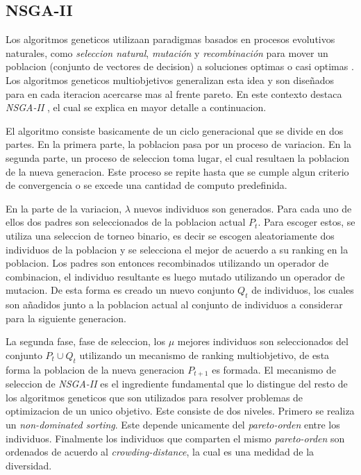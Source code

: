 \subsection{NSGA-II}

Los algoritmos geneticos utilizaan paradigmas basados en procesos evolutivos naturales, como \textit{seleccion natural}, \textit{mutaci\'on} y \textit{recombinaci\'on} para mover un poblacion (conjunto de vectores de decision) a soluciones optimas o casi optimas \cite{back1996evolutionary}. Los algoritmos geneticos multiobjetivos generalizan esta idea y son diseñados para en cada iteracion acercarse mas al frente pareto. En este contexto destaca \emph{NSGA-II} \cite{deb2002nsgaii}, el cual se explica en mayor detalle a continuacion.

El algoritmo consiste basicamente de un ciclo generacional que se divide en dos partes. En la primera parte, la poblacion pasa por un proceso de variacion. En la segunda parte, un proceso de seleccion toma lugar, el cual resultaen la poblacion de la nueva generacion. Este proceso se repite hasta que se cumple algun criterio de convergencia o se excede una cantidad de computo predefinida.

En la parte de la variacion, $\lambda$ nuevos individuos son generados. Para cada uno de ellos dos padres son seleccionados de la poblacion actual $P_t$. Para escoger estos, se utiliza una seleccion de torneo binario, es decir se escogen aleatoriamente dos individuos de la poblacion y se selecciona el mejor de acuerdo a su ranking en la poblacion. Los padres son entonces recombinados utilizando un operador de combinacion, el individuo resultante es luego mutado utilizando un operador de mutacion. De esta forma es creado un nuevo conjunto $Q_t$ de individuos, los cuales son añadidos junto a la poblacion actual al conjunto de individuos a considerar para la siguiente generacion.

La segunda fase, fase de seleccion, los $\mu$ mejores individuos son seleccionados del conjunto $P_t \cup Q_t$ utilizando un mecanismo de ranking multiobjetivo, de esta forma la poblacion de la nueva generacion $P_{t+1}$ es formada. El mecanismo de seleccion de \emph{NSGA-II} es el ingrediente fundamental que lo distingue del resto de los algoritmos geneticos que son utilizados para resolver problemas de optimizacion de un unico objetivo. Este consiste de dos niveles. Primero se realiza un \emph{non-dominated sorting}. Este depende unicamente del \emph{pareto-orden} entre los individuos. Finalmente los individuos que comparten el mismo \emph{pareto-orden} son ordenados de acuerdo al \emph{crowding-distance}, la cual es una medidad de la diversidad.


